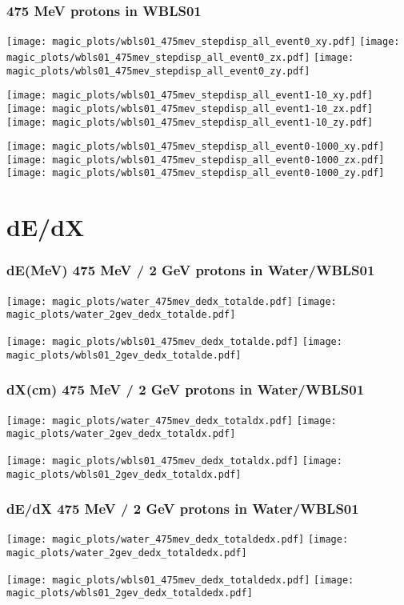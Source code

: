 \documentclass[xcolor=dvipsnames]{beamer}
\begin{document}
\begin{frame}[fragile]
  \frametitle{475 MeV protons in WBLS01}
  \texttt{[image: magic\_plots/wbls01\_475mev\_stepdisp\_all\_event0\_xy.pdf]}%
  \texttt{[image: magic\_plots/wbls01\_475mev\_stepdisp\_all\_event0\_zx.pdf]}%
  \texttt{[image: magic\_plots/wbls01\_475mev\_stepdisp\_all\_event0\_zy.pdf]}%

  \texttt{[image: magic\_plots/wbls01\_475mev\_stepdisp\_all\_event1-10\_xy.pdf]}%
  \texttt{[image: magic\_plots/wbls01\_475mev\_stepdisp\_all\_event1-10\_zx.pdf]}%
  \texttt{[image: magic\_plots/wbls01\_475mev\_stepdisp\_all\_event1-10\_zy.pdf]}%

  \texttt{[image: magic\_plots/wbls01\_475mev\_stepdisp\_all\_event0-1000\_xy.pdf]}%
  \texttt{[image: magic\_plots/wbls01\_475mev\_stepdisp\_all\_event0-1000\_zx.pdf]}%
  \texttt{[image: magic\_plots/wbls01\_475mev\_stepdisp\_all\_event0-1000\_zy.pdf]}%
\end{frame}

\section {dE/dX}

\begin{frame}[fragile]
  \frametitle{dE(MeV) 475 MeV / 2 GeV protons in Water/WBLS01}

  \texttt{[image: magic\_plots/water\_475mev\_dedx\_totalde.pdf]}%
  \texttt{[image: magic\_plots/water\_2gev\_dedx\_totalde.pdf]}

  \texttt{[image: magic\_plots/wbls01\_475mev\_dedx\_totalde.pdf]}%
  \texttt{[image: magic\_plots/wbls01\_2gev\_dedx\_totalde.pdf]}
\end{frame}
\begin{frame}[fragile]
  \frametitle{dX(cm) 475 MeV / 2 GeV protons in Water/WBLS01}

  \texttt{[image: magic\_plots/water\_475mev\_dedx\_totaldx.pdf]}%
  \texttt{[image: magic\_plots/water\_2gev\_dedx\_totaldx.pdf]}

  \texttt{[image: magic\_plots/wbls01\_475mev\_dedx\_totaldx.pdf]}%
  \texttt{[image: magic\_plots/wbls01\_2gev\_dedx\_totaldx.pdf]}
\end{frame}
\begin{frame}[fragile]
  \frametitle{dE/dX 475 MeV / 2 GeV protons in Water/WBLS01}

  \texttt{[image: magic\_plots/water\_475mev\_dedx\_totaldedx.pdf]}%
  \texttt{[image: magic\_plots/water\_2gev\_dedx\_totaldedx.pdf]}

  \texttt{[image: magic\_plots/wbls01\_475mev\_dedx\_totaldedx.pdf]}%
  \texttt{[image: magic\_plots/wbls01\_2gev\_dedx\_totaldedx.pdf]}
\end{frame}
\end{document}
